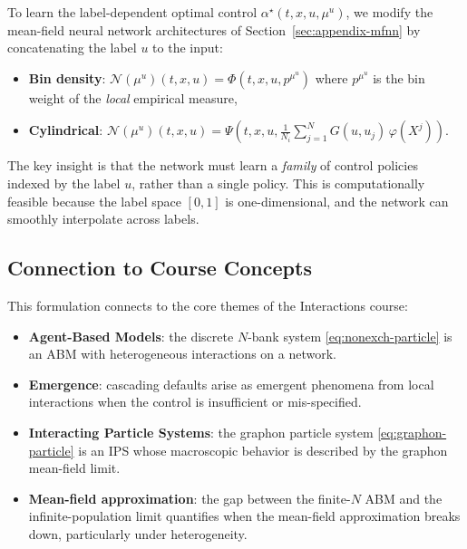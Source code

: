 \documentclass[11pt]{article}
\begin{document}
To learn the label-dependent optimal control $\alpha^\star(t, x, u, \mu^u)$, we modify the mean-field neural network architectures of Section~\ref{sec:appendix-mfnn} by concatenating the label $u$ to the input:
\begin{itemize}
  \item \textbf{Bin density}: $\mathcal{N}(\mu^u)(t, x, u) = \Phi(t, x, u, p^{\mu^u})$ where $p^{\mu^u}$ is the bin weight of the \emph{local} empirical measure,
  \item \textbf{Cylindrical}: $\mathcal{N}(\mu^u)(t, x, u) = \Psi\!\left(t, x, u, \frac{1}{N_i}\sum_{j=1}^N G(u, u_j)\,\varphi(X^j)\right)$.
\end{itemize}

The key insight is that the network must learn a \emph{family} of control policies indexed by the label $u$, rather than a single policy. This is computationally feasible because the label space $[0,1]$ is one-dimensional, and the network can smoothly interpolate across labels.

\subsection{Connection to Course Concepts}

This formulation connects to the core themes of the Interactions course:
\begin{itemize}
  \item \textbf{Agent-Based Models}: the discrete $N$-bank system \eqref{eq:nonexch-particle} is an ABM with heterogeneous interactions on a network.
  \item \textbf{Emergence}: cascading defaults arise as emergent phenomena from local interactions when the control is insufficient or mis-specified.
  \item \textbf{Interacting Particle Systems}: the graphon particle system \eqref{eq:graphon-particle} is an IPS whose macroscopic behavior is described by the graphon mean-field limit.
  \item \textbf{Mean-field approximation}: the gap between the finite-$N$ ABM and the infinite-population limit quantifies when the mean-field approximation breaks down, particularly under heterogeneity.
\end{itemize}
\end{document}

